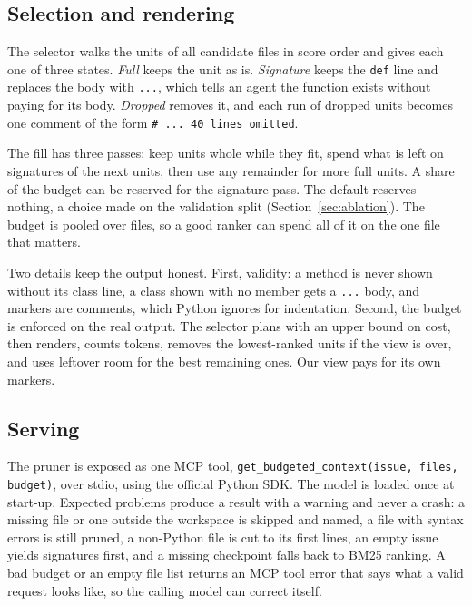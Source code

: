 \subsection{Selection and rendering}

The selector walks the units of all candidate files in score order and gives each one of three states. \emph{Full} keeps the unit as is. \emph{Signature} keeps the \texttt{def} line and replaces the body with \texttt{...}, which tells an agent the function exists without paying for its body. \emph{Dropped} removes it, and each run of dropped units becomes one comment of the form \texttt{\# ... 40 lines omitted}.

The fill has three passes: keep units whole while they fit, spend what is left on signatures of the next units, then use any remainder for more full units. A share of the budget can be reserved for the signature pass. The default reserves nothing, a choice made on the validation split (Section~\ref{sec:ablation}). The budget is pooled over files, so a good ranker can spend all of it on the one file that matters.

Two details keep the output honest. First, validity: a method is never shown without its class line, a class shown with no member gets a \texttt{...} body, and markers are comments, which Python ignores for indentation. Second, the budget is enforced on the real output. The selector plans with an upper bound on cost, then renders, counts tokens, removes the lowest-ranked units if the view is over, and uses leftover room for the best remaining ones. Our view pays for its own markers.

\subsection{Serving}

The pruner is exposed as one MCP tool, \texttt{get\_budgeted\_context(issue, files, budget)}, over stdio, using the official Python SDK. The model is loaded once at start-up. Expected problems produce a result with a warning and never a crash: a missing file or one outside the workspace is skipped and named, a file with syntax errors is still pruned, a non-Python file is cut to its first lines, an empty issue yields signatures first, and a missing checkpoint falls back to BM25 ranking. A bad budget or an empty file list returns an MCP tool error that says what a valid request looks like, so the calling model can correct itself.
